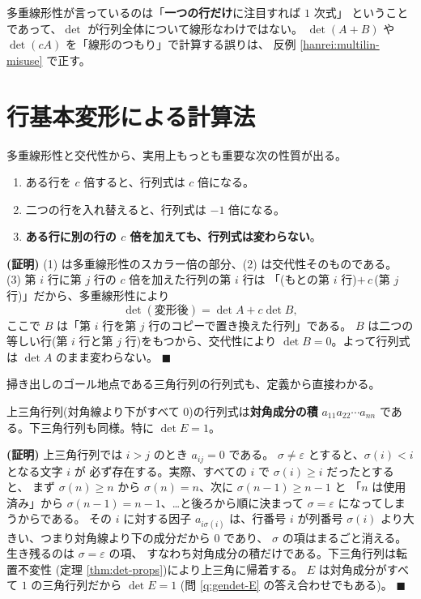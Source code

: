 \begin{chui}
多重線形性が言っているのは「\textbf{一つの行だけ}に注目すれば $1$ 次式」
ということであって、$\det$ が行列全体について線形なわけではない。
$\det(A + B)$ や $\det(cA)$ を「線形のつもり」で計算する誤りは、
反例 \ref{hanrei:multilin-misuse} で正す。
\end{chui}

\section{行基本変形による計算法}

多重線形性と交代性から、実用上もっとも重要な次の性質が出る。

\begin{teiri}[行基本変形と行列式]\label{thm:det-rowop}
\begin{enumerate}
\item ある行を $c$ 倍すると、行列式は $c$ 倍になる。
\item 二つの行を入れ替えると、行列式は $-1$ 倍になる。
\item \textbf{ある行に別の行の $c$ 倍を加えても、行列式は変わらない}。
\end{enumerate}
\end{teiri}

\noindent\textbf{(証明)}\quad
(1) は多重線形性のスカラー倍の部分、(2) は交代性そのものである。
(3) 第 $i$ 行に第 $j$ 行の $c$ 倍を加えた行列の第 $i$ 行は
「(もとの第 $i$ 行)$+\, c\,$(第 $j$ 行)」だから、多重線形性により
\[
\det(\text{変形後}) = \det A + c \det B,
\]
ここで $B$ は「第 $i$ 行を第 $j$ 行のコピーで置き換えた行列」である。
$B$ は二つの等しい行(第 $i$ 行と第 $j$ 行)をもつから、交代性により
$\det B = 0$。よって行列式は $\det A$ のまま変わらない。 $\blacksquare$

掃き出しのゴール地点である三角行列の行列式も、定義から直接わかる。

\begin{teiri}[三角行列の行列式]\label{thm:det-tri}
上三角行列(対角線より下がすべて $0$)の行列式は\textbf{対角成分の積}
$a_{11}a_{22} \cdots a_{nn}$ である。下三角行列も同様。特に $\det E = 1$。
\end{teiri}

\noindent\textbf{(証明)}\quad
上三角行列では $i > j$ のとき $a_{ij} = 0$ である。
$\sigma \neq \varepsilon$ とすると、$\sigma(i) < i$ となる文字 $i$ が
必ず存在する。実際、すべての $i$ で $\sigma(i) \ge i$ だったとすると、
まず $\sigma(n) \ge n$ から $\sigma(n) = n$、次に $\sigma(n-1) \ge n-1$ と
「$n$ は使用済み」から $\sigma(n-1) = n - 1$、…と後ろから順に決まって
$\sigma = \varepsilon$ になってしまうからである。
その $i$ に対する因子 $a_{i\sigma(i)}$ は、行番号 $i$ が列番号 $\sigma(i)$
より大きい、つまり対角線より下の成分だから $0$ であり、
$\sigma$ の項はまるごと消える。生き残るのは $\sigma = \varepsilon$ の項、
すなわち対角成分の積だけである。下三角行列は転置不変性
(定理 \ref{thm:det-props})により上三角に帰着する。
$E$ は対角成分がすべて $1$ の三角行列だから $\det E = 1$
(問 \ref{q:gendet-E} の答え合わせでもある)。 $\blacksquare$


